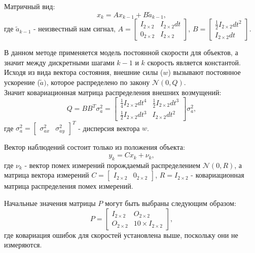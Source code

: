 Матричный вид:
\begin{equation}
    x_k = A x_{k-1} + B \widetilde{a}_{k-1},
\end{equation}
где $\widetilde{a}_{k-1}$ - неизвестный нам сигнал, $A = \begin{bmatrix}
    I_{2\times2} & I_{2\times2}dt \\
    0_{2\times2} & I_{2\times2}
\end{bmatrix}$, $B = \begin{bmatrix}
    \frac{1}{2} I_{2\times2} dt^2 \\ I_{2\times2} dt
\end{bmatrix}$.

В данном методе применяется модель постоянной скорости для объектов, а значит между дискретными шагами $k-1$ и $k$ скорость является константой. \\ 
Исходя из вида вектора состояния, внешние силы ($w$) вызывают постоянное ускорение ($\widetilde{a})$, которое распределено по закону $\mathcal{N}(0, Q)$. \\
Значит ковариационная матрица распределения внешних возмущений:
\begin{equation}
    Q = B B^T \sigma_a^2 = \begin{bmatrix}
        \frac{1}{4} I_{2\times2} dt^4 & \frac{1}{2} I_{2\times2} dt^3 \\
        \frac{1}{2} I_{2\times2} dt^3 & I_{2\times2} dt^2
    \end{bmatrix} \sigma_a^2,
\end{equation}
где $\sigma_a^2 = \begin{bmatrix}
    \sigma_{ax}^2 & \sigma_{ay}^2
\end{bmatrix}^T$ - дисперсия вектора $w$.

Вектор наблюдений состоит только из положения объекта:
\begin{equation}
    y_k = C x_k + \nu_k,
\end{equation}
где $\nu_k$ - вектор помех измерений порождаемый распределением $\mathcal{N}(0, R)$, а матрица вектора измерений $C = \begin{bmatrix}
    I_{2\times2} & 0_{2\times2}
\end{bmatrix}$, $R = I_{2\times2}$ - ковариационная матрица распределения помех измерений.

Начальные значения матрицы $P$ могут быть выбраны следующим образом:
\begin{equation}
    P = \begin{bmatrix}
        I_{2\times2} & O_{2\times2} \\
        O_{2\times2} & 10 \times I_{2\times2}
    \end{bmatrix},
\end{equation}
где ковариация ошибок для скоростей установлена выше, поскольку они не измеряются.

